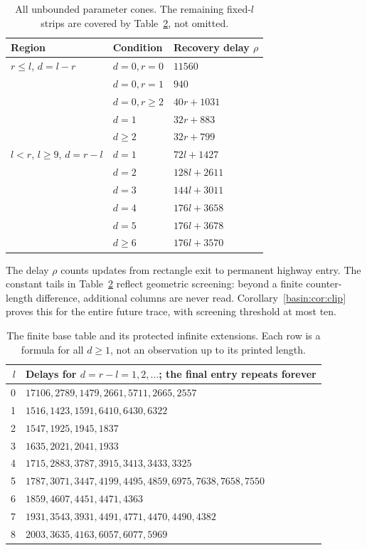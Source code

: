\begin{table}[t]
\centering
\begin{tabular}{lll}
\toprule
Region & Condition & Recovery delay $\rho$\\\midrule
$r\le l$, $d=l-r$ & $d=0,r=0$ & $11560$\\
 & $d=0,r=1$ & $940$\\
 & $d=0,r\ge2$ & $40r+1031$\\
 & $d=1$ & $32r+883$\\
 & $d\ge2$ & $32r+799$\\\midrule
$l<r$, $l\ge9$, $d=r-l$ & $d=1$ & $72l+1427$\\
 & $d=2$ & $128l+2611$\\
 & $d=3$ & $144l+3011$\\
 & $d=4$ & $176l+3658$\\
 & $d=5$ & $176l+3678$\\
 & $d\ge6$ & $176l+3570$\\\bottomrule
\end{tabular}
\caption{All unbounded parameter cones. The remaining fixed-$l$ strips are
covered by Table~\ref{basin:tab:small}, not omitted.}\label{basin:tab:recovery}
\end{table}

The delay $\rho$ counts updates from rectangle exit to permanent highway
entry. The constant tails in Table~\ref{basin:tab:small} reflect geometric
screening: beyond a finite counter-length difference, additional columns are
never read. Corollary~\ref{basin:cor:clip} proves this for the entire future
trace, with screening threshold at most ten.

\begin{table}[t]
\centering\small
\begin{tabular}{rl}
\toprule
$l$ & Delays for $d=r-l=1,2,\ldots$; the final entry repeats forever\\\midrule
0 & $17106,2789,1479,2661,5711,2665,2557$\\
1 & $1516,1423,1591,6410,6430,6322$\\
2 & $1547,1925,1945,1837$\\
3 & $1635,2021,2041,1933$\\
4 & $1715,2883,3787,3915,3413,3433,3325$\\
5 & $1787,3071,3447,4199,4495,4859,6975,7638,7658,7550$\\
6 & $1859,4607,4451,4471,4363$\\
7 & $1931,3543,3931,4491,4771,4470,4490,4382$\\
8 & $2003,3635,4163,6057,6077,5969$\\\bottomrule
\end{tabular}
\caption{The finite base table and its protected infinite extensions. Each row
is a formula for all $d\ge1$, not an observation up to its printed length.}
\label{basin:tab:small}
\end{table}

